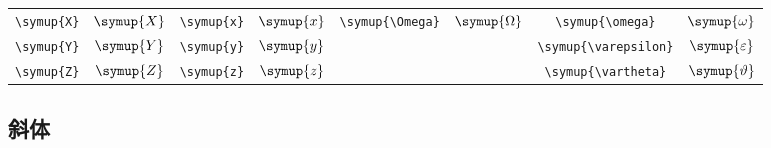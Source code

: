\begin{longtable}{cccccccc}
    \verb|\symup{X}| & \(\symup{X}\) & \verb|\symup{x}| & \(\symup{x}\) & \verb|\symup{\Omega}|   & \(\symup{\Omega}\)   & \verb|\symup{\omega}|      & \(\symup{\omega}\)      \\
    \verb|\symup{Y}| & \(\symup{Y}\) & \verb|\symup{y}| & \(\symup{y}\) &                         &                      & \verb|\symup{\varepsilon}| & \(\symup{\varepsilon}\) \\
    \verb|\symup{Z}| & \(\symup{Z}\) & \verb|\symup{z}| & \(\symup{z}\) &                         &                      & \verb|\symup{\vartheta}|   & \(\symup{\vartheta}\)   \\
    \bottomrule
\end{longtable}

\subsection{斜体}

